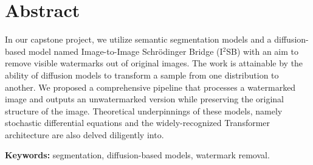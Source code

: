 \chapter*{Abstract}
In our capstone project, we utilize semantic segmentation models and a diffusion-based model named Image-to-Image Schrödinger Bridge (I$^2$SB) with an aim to remove visible watermarks out of original images. The work is attainable by the ability of diffusion models to transform a sample from one distribution to another. We proposed a comprehensive pipeline that processes a watermarked image and outputs an unwatermarked version while preserving the original structure of the image. Theoretical underpinnings of these models, namely stochastic differential equations and the widely-recognized Transformer architecture are also delved diligently into. 

\textbf{Keywords:} segmentation, diffusion-based models, watermark removal.

